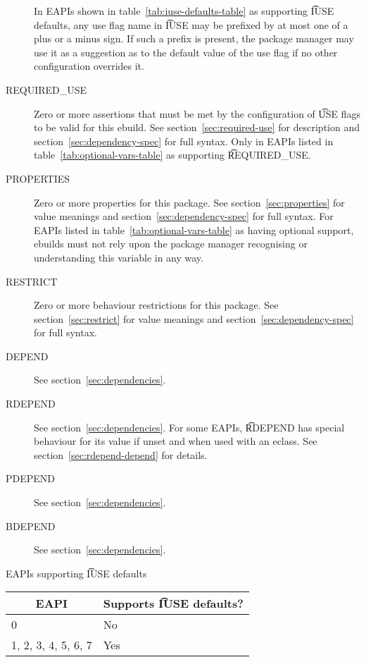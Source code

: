 \begin{description}
     In EAPIs shown in table~\ref{tab:iuse-defaults-table} as supporting
    \t{IUSE} defaults, any use flag name in \t{IUSE} may be prefixed by at most one of a plus or a
    minus sign. If such a prefix is present, the package manager may use it as a suggestion as to
    the default value of the use flag if no other configuration overrides it.
\item[REQUIRED_USE]  Zero or more assertions that must be met by the
    configuration of \t{USE} flags to be valid for this ebuild. See section~\ref{sec:required-use}
    for description and section~\ref{sec:dependency-spec} for full syntax. Only in EAPIs listed in
    table~\ref{tab:optional-vars-table} as supporting \t{REQUIRED_USE}.
\item[PROPERTIES]  Zero or more properties for this package.
    See section~\ref{sec:properties} for value meanings and section~\ref{sec:dependency-spec} for
    full syntax. For EAPIs listed in table~\ref{tab:optional-vars-table} as having optional support,
    ebuilds must not rely upon the package manager recognising or understanding this variable in
    any way.
\item[RESTRICT] Zero or more behaviour restrictions for this package. See section~\ref{sec:restrict}
    for value meanings and section~\ref{sec:dependency-spec} for full syntax.
\item[DEPEND] See section~\ref{sec:dependencies}.
\item[RDEPEND] See section~\ref{sec:dependencies}. For some EAPIs, \t{RDEPEND} has special behaviour
    for its value if unset and when used with an eclass. See section~\ref{sec:rdepend-depend} for
    details.
\item[PDEPEND] See section~\ref{sec:dependencies}.
\item[BDEPEND] See section~\ref{sec:dependencies}.
\end{description}

\begin{centertable}{EAPIs supporting \t{IUSE} defaults}
    \label{tab:iuse-defaults-table}
    \begin{tabular}{ll}
      \toprule
      \multicolumn{1}{c}{\textbf{EAPI}} &
      \multicolumn{1}{c}{\textbf{Supports \t{IUSE} defaults?}} \\
      \midrule
      0                         & No  \\
      1, 2, 3, 4, 5, 6, 7       & Yes \\
      \bottomrule
    \end{tabular}
\end{centertable}

